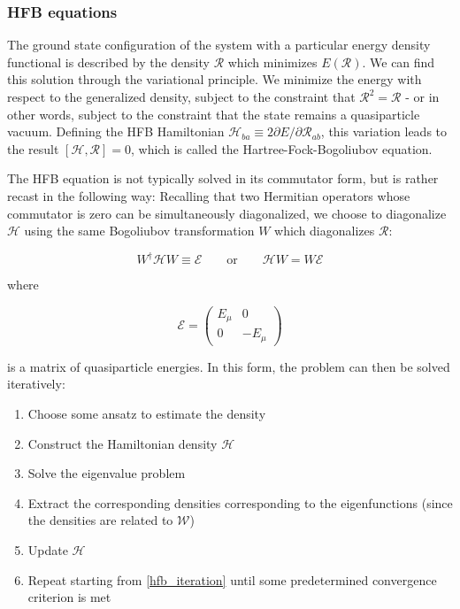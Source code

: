 
\subsubsection{HFB equations}

The ground state configuration of the system with a particular energy density functional is described by the density $\mathcal{R}$ which minimizes $E(\mathcal{R})$. We can find this solution through the variational principle. We minimize the energy with respect to the generalized density, subject to the constraint that $\mathcal{R}^2=\mathcal{R}$ - or in other words, subject to the constraint that the state remains a quasiparticle vacuum. Defining the HFB Hamiltonian $\mathcal{H}_{ba} \equiv 2 \partial E/\partial \mathcal{R}_{ab}$, this variation leads to the result $\left[\mathcal{H},\mathcal{R}\right]=0$, which is called the Hartree-Fock-Bogoliubov equation.

The HFB equation is not typically solved in its commutator form, but is rather recast in the following way: Recalling that two Hermitian operators whose commutator is zero can be simultaneously diagonalized, we choose to diagonalize $\mathcal{H}$ using the same Bogoliubov transformation $W$ which diagonalizes $\mathcal{R}$:

\begin{equation}
W^\dagger \mathcal{H} W \equiv \mathcal{E} \qquad\mathrm{or}\qquad \mathcal{H}W = W\mathcal{E}
\end{equation}

\noindent where

\begin{equation}
\mathcal{E} = \left(\begin{array}{cc}
E_\mu & 0 \\
0 & -E_\mu
\end{array}\right)
\end{equation}

\noindent is a matrix of quasiparticle energies. In this form, the problem can then be solved iteratively:
\begin{enumerate}
	\setlength\itemsep{-2em}
	\item Choose some ansatz to estimate the density\\
	\item Construct the Hamiltonian density $\mathcal{H}$\\
	\item Solve the eigenvalue problem \label{hfb_iteration}\\
	\item Extract the corresponding densities corresponding to the eigenfunctions (since the densities are related to $\mathcal{W}$)\\
	\item Update $\mathcal{H}$ \\
	\item Repeat starting from \ref{hfb_iteration} until some predetermined convergence criterion is met
\end{enumerate}

